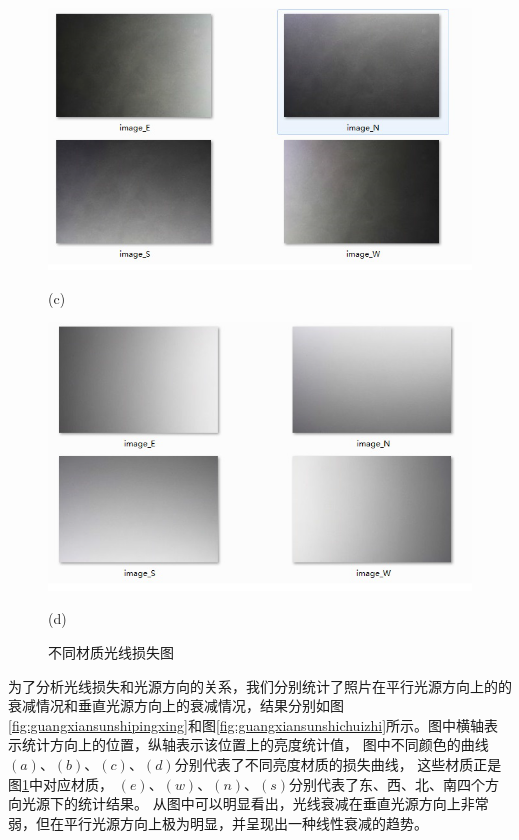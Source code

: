 \begin{figure}[htbp]
\begin{minipage}{0.5\linewidth}
\centerline{\includegraphics[width=1\linewidth]{figures/gaungxiansunshic.png}}
\centerline{(c)}
\end{minipage}
\begin{minipage}{0.5\linewidth}
\centerline{\includegraphics[width=1\linewidth]{figures/gaungxiansunshid.png}}
\centerline{(d)}
\end{minipage}

\caption{不同材质光线损失图}
\label{fig:guangxiansunshi}
\vspace{-3mm}
\end{figure}
为了分析光线损失和光源方向的关系，我们分别统计了照片在平行光源方向上的的衰减情况和垂直光源方向上的衰减情况，结果分别如图\ref{fig:guangxiansunshipingxing}和图\ref{fig:guangxiansunshichuizhi}所示。图中横轴表示统计方向上的位置，纵轴表示该位置上的亮度统计值，
图中不同颜色的曲线$(a)$、$(b)$、$(c)$、$(d)$分别代表了不同亮度材质的损失曲线，
这些材质正是图\ref{fig:guangxiansunshi}中对应材质，
$(e)$、$(w)$、$(n)$、$(s)$分别代表了东、西、北、南四个方向光源下的统计结果。
从图中可以明显看出，光线衰减在垂直光源方向上非常弱，但在平行光源方向上极为明显，并呈现出一种线性衰减的趋势。

